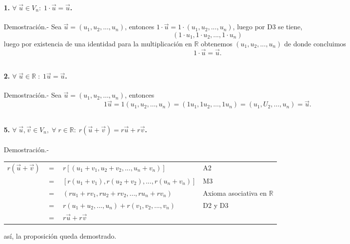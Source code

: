 \begin{enumerate}

\item[\large\bfseries 1.] \textbf{\boldmath $\forall\; \vec{u} \in V_n:\;  1\cdot \vec{u} = \vec{u}$.}\\\\
    Demostración.-\; Sea $\vec{u} = (u_1,u_2,...,u_n)$, entonces $1\cdot \vec{u} = 1\cdot (u_1,u_2,...,u_n)$, luego por D3 se tiene, $$(1\cdot u_1,1\cdot u_2,...,1\cdot u_n)$$
    luego por existencia de una identidad para la multiplicación en $\mathbb{R}$ obtenemos $(u_1,u_2,...,u_n)$ de donde concluimos $$1\cdot \vec{u} = \vec{u}.$$\\

\item[\large\bfseries 2.] \textbf{\boldmath $\forall\; \vec{u} \in \mathbb{R}\; :\; 1\vec{u}=\vec{u}$.}\\\\
    Demostración.-\; Sea $\vec{u}=(u_1,u_2,\ldots , u_n)$, entonces
    $$1\vec{u}=1(u_1,u_2,\ldots , u_n)=(1u_1, 1u_2, \ldots , 1u_n) = (u_1,U_2,\ldots , u_n)=\vec{u}.$$\\

    \item[\large\bfseries 5.] \textbf{\boldmath $\forall\; \vec{u},\vec{v} \in V_n, \; \forall\; r \in \mathbb{R}:\; r(\vec{u}+\vec{v}) = r\vec{u} + r\vec{v}$.}\\\\
    Demostración.-\; 
    \begin{center}
	\begin{tabular}{rcll}
	    $r(\vec{u}+\vec{v})$&$=$&$r\left[(u_1+v_1,u_2+v_2,...,u_n+v_n)\right]$&A2\\
	    &$=$&$\left[r(u_1+v_1),r(u_2+v_2),...,r(u_n+v_n)\right]$&M3\\
	    &$=$&$(ru_1+rv_1,ru_2+rv_2,...,ru_n+rv_n)$&Axioma asociativa en $\mathbb{R}$\\
	    &$=$&$r(u_1+u_2,...,u_n)+r(v_1,v_2,...,v_n)$&D2 y D3\\
	    &$=$&$r\vec{u} + r\vec{v}$&\\
	\end{tabular}
    \end{center}
    así, la proposición queda demostrado.\\\\

\end{enumerate}

